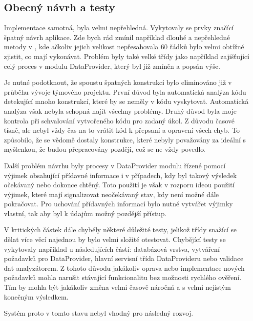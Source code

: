 \documentclass[thesis=B,czech]{FITthesis}[2012/06/26]
\begin{document}
\subsection{Obecný návrh a testy}
Implementace samotná, byla velmi nepřehledná. Vykytovaly se prvky značící špatný návrh aplikace.
Zde bych rád zmínil například dlouhé a nepřehledné metody v
, kde ačkoliv jejich velikost 
nepřesahovala 60 řádků bylo velmi obtížné zjistit, co mají vykonávat. Problém byly také velké třídy
jako například  zajišťující celý proces v modulu DataProvider, který byl již zmíněn a popsán výše.
\par
Je nutné podotknout, že spoustu špatných konstrukcí bylo eliminováno již v průběhu vývoje týmového projektu.
První důvod byla automatická analýza kódu detekující mnoho konstrukcí, které by se neměly v kódu vyskytovat. Automatická analýza
však nebyla schopná najít všechny problémy. Druhý důvod byla moje kontrola při schvalování vytvořeného kódu pro 
zadaný úkol. Z důvodu časové tísně, ale nebyl vždy čas na to vrátit kód k přepsaní a opravení všech chyb. To způsobilo, že
se vědomě dostaly konstrukce, které nebyly považovány za ideální s myšlenkou, že budou přepracovány později, což se ne vždy povedlo.
\par
Další problém návrhu byly procesy v DataProvider modulu řízené pomocí výjimek obsahující 
přídavné informace i v případech, kdy byl takový výsledek očekávaný nebo dokonce chtěný. 
Toto použití je však v rozporu ideou použití výjimek, které mají signalizovat neočekávaný stav, kdy není možné dále pokračovat.\cite{exception}
Pro uchování přídavných informací bylo nutné vytvářet výjimky vlastní, tak aby byl k údajům možný pozdější přístup.
\par
V kritických částek dále chyběly některé důležité testy, jelikož třídy snažící se dělat více věcí najednou by bylo velmi
složité otestovat. Chybějící testy se vykytovaly například u následujících částí: databázová vrstva, vytváření požadavků pro DataProvider,
hlavní servisní třída DataProvideru nebo validace dat analyzátorem. Z tohoto důvodu jakákoliv oprava nebo implementace nových požadavků 
mohla narušit stávající funkcionalitu bez možnosti rychlého ověření. Tím by mohla být jakákoliv změna velmi časově náročná a s velmi nejistým konečným výsledkem.

Systém proto v tomto stavu nebyl vhodný pro následný rozvoj.
\end{document}
